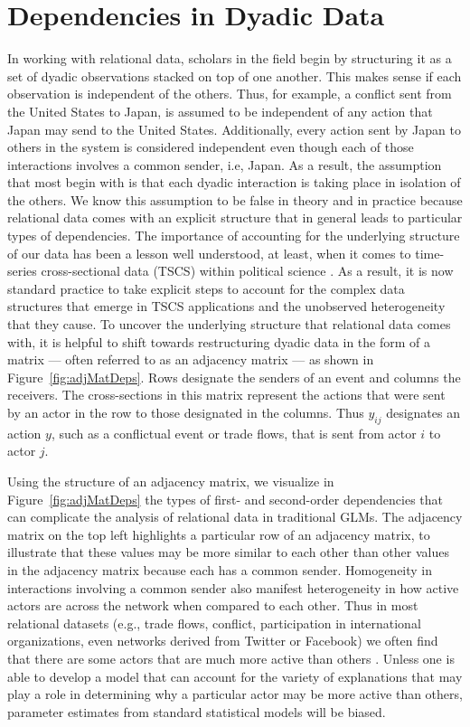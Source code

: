 \section{\textbf{Dependencies in Dyadic Data}}

In working with relational data, scholars in the field begin by structuring it as a set of dyadic observations stacked on top of one another. This makes sense if each observation is independent of the others. Thus, for example, a conflict sent from the United States to Japan, is assumed to be independent of any action that Japan may send to the United States. Additionally, every action sent by Japan to others in the system is considered independent even though each of those interactions involves a common sender, i.e, Japan. As a result, the assumption that most begin with is that each dyadic interaction is taking place in isolation of the others. We know this assumption to be false in theory and in practice because relational data comes with an explicit structure that in general leads to particular types of dependencies. The importance of accounting for the underlying structure of our data has been a lesson well understood, at least, when it comes to time-series cross-sectional data (TSCS) within political science \citep{beck:katz:1995,beck:etal:1998}. As a result, it is now standard practice to take explicit steps to account for the complex data structures that emerge in TSCS applications and the unobserved heterogeneity that they cause. To uncover the underlying structure that relational data comes with, it is helpful to shift towards restructuring dyadic data in the form of a matrix --- often referred to as an adjacency matrix --- as shown in Figure~\ref{fig:adjMatDeps}. Rows designate the senders of an event and columns the receivers. The cross-sections in this matrix represent the actions that were sent by an actor in the row to those designated in the columns. Thus $y_{ij}$ designates an action $y$, such as a conflictual event or trade flows, that is sent from actor $i$ to actor $j$. 

Using the structure of an adjacency matrix, we visualize in Figure~\ref{fig:adjMatDeps} the types of first- and second-order dependencies that can complicate the analysis of relational data in traditional GLMs. The adjacency matrix on the top left highlights a particular row of an adjacency matrix, to illustrate that these values may be more similar to each other than other values in the adjacency matrix because each has a common sender. Homogeneity in interactions involving a common sender also manifest heterogeneity in how active actors are across the network when compared to each other. Thus in most relational datasets (e.g., trade flows, conflict, participation in international organizations, even networks derived from Twitter or Facebook) we often find that there are some actors that are much more active than others \citep{barabasi:reka:1999}. Unless one is able to develop a model that can account for the variety of explanations that may play a role in determining why a particular actor may be more active than others, parameter estimates from standard statistical models will be biased.

